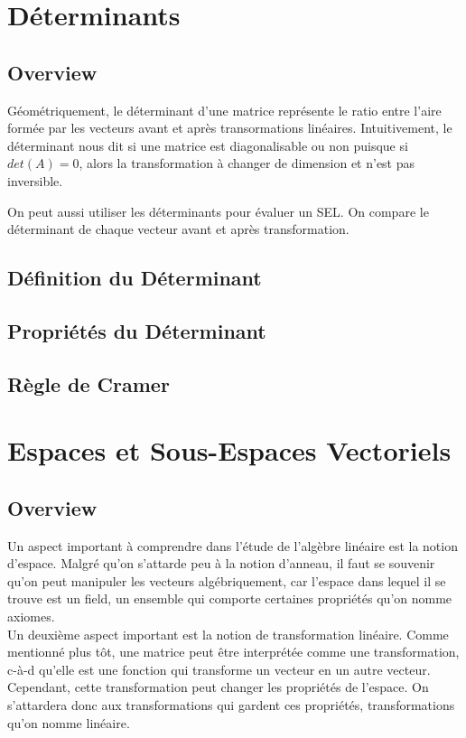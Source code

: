 \documentclass{article}
\begin{document}
\pagebreak
\section{Déterminants}
\subsection{Overview}

Géométriquement, le déterminant d'une matrice représente le ratio entre l'aire
formée par les vecteurs avant et après transormations linéaires. Intuitivement,
le déterminant nous dit si une matrice est diagonalisable ou non puisque si
$det(A)=0$, alors la transformation à changer de dimension et n'est pas inversible.

On peut aussi utiliser les déterminants pour évaluer un SEL. On compare le déterminant
de chaque vecteur avant et après transformation.

\subsection{Définition du Déterminant}
\subsection{Propriétés du Déterminant}
\subsection{Règle de Cramer}

\pagebreak

\section{Espaces et Sous-Espaces Vectoriels}
\subsection{Overview}

Un aspect important à comprendre dans l'étude de l'algèbre linéaire est la notion
d'espace. Malgré qu'on s'attarde peu à la notion d'anneau, il faut se souvenir
qu'on peut manipuler les vecteurs algébriquement, car l'espace dans lequel il se
trouve est un field, un ensemble qui comporte certaines propriétés qu'on nomme
axiomes.\\

Un deuxième aspect important est la notion de transformation linéaire. Comme mentionné
plus tôt, une matrice peut être interprétée comme une transformation, c-à-d qu'elle
est une fonction qui transforme un vecteur en un autre vecteur. Cependant, cette
transformation peut changer les propriétés de l'espace. On s'attardera donc aux
transformations qui gardent ces propriétés, transformations qu'on nomme linéaire.
\end{document}
